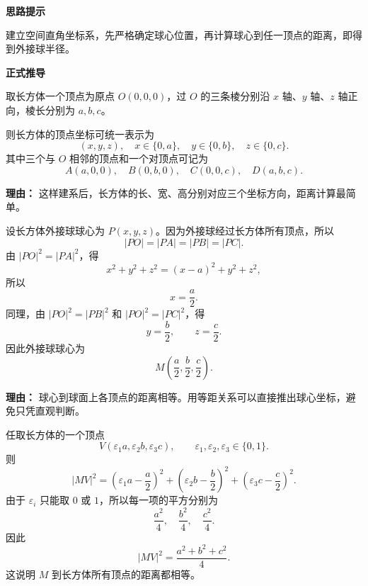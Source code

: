 \begin{proofbox}
	\textbf{\textcolor{CProof}{思路提示}}

	建立空间直角坐标系，先严格确定球心位置，再计算球心到任一顶点的距离，即得到外接球半径。

	\medskip
	\textbf{\textcolor{CProof}{正式推导}}
	\begin{description}[style=nextline, leftmargin=2.8em, labelsep=0.5em, itemsep=0.55em]
		\item[\textbf{步骤一（建立坐标系）：}]
		      取长方体一个顶点为原点 $O(0,0,0)$，过 $O$ 的三条棱分别沿 $x$ 轴、$y$ 轴、$z$ 轴正向，棱长分别为 $a,b,c$。

		      则长方体的顶点坐标可统一表示为
		      \[
			      (x,y,z),\quad x\in\{0,a\},\quad y\in\{0,b\},\quad z\in\{0,c\}.
		      \]
		      其中三个与 $O$ 相邻的顶点和一个对顶点可记为
		      \[
			      A(a,0,0),\quad B(0,b,0),\quad C(0,0,c),\quad D(a,b,c).
		      \]
		      \par\textbf{理由：}
		      这样建系后，长方体的长、宽、高分别对应三个坐标方向，距离计算最简单。

		\item[\textbf{步骤二（严格确定球心）：}]
		      设长方体外接球球心为 $P(x,y,z)$。因为外接球经过长方体所有顶点，所以
		      \[
			      |PO|=|PA|=|PB|=|PC|.
		      \]
		      由 $|PO|^2=|PA|^2$，得
		      \[
			      x^2+y^2+z^2=(x-a)^2+y^2+z^2,
		      \]
		      所以
		      \[
			      x=\frac{a}{2}.
		      \]
		      同理，由 $|PO|^2=|PB|^2$ 和 $|PO|^2=|PC|^2$，得
		      \[
			      y=\frac{b}{2},\qquad z=\frac{c}{2}.
		      \]
		      因此外接球球心为
		      \[
			      M\left(\frac{a}{2},\frac{b}{2},\frac{c}{2}\right).
		      \]
		      \par\textbf{理由：}
		      球心到球面上各顶点的距离相等。用等距关系可以直接推出球心坐标，避免只凭直观判断。

		\item[\textbf{步骤三（验证所有顶点都在同一球面上）：}]
		      任取长方体的一个顶点
		      \[
			      V(\varepsilon_1 a,\varepsilon_2 b,\varepsilon_3 c),
			      \qquad \varepsilon_1,\varepsilon_2,\varepsilon_3\in\{0,1\}.
		      \]
		      则
		      \[
			      |MV|^2
			      =
			      \left(\varepsilon_1a-\frac{a}{2}\right)^2
			      +
			      \left(\varepsilon_2b-\frac{b}{2}\right)^2
			      +
			      \left(\varepsilon_3c-\frac{c}{2}\right)^2.
		      \]
		      由于 $\varepsilon_i$ 只能取 $0$ 或 $1$，所以每一项的平方分别为
		      \[
			      \frac{a^2}{4},\quad \frac{b^2}{4},\quad \frac{c^2}{4}.
		      \]
		      因此
		      \[
			      |MV|^2=\frac{a^2+b^2+c^2}{4}.
		      \]
		      这说明 $M$ 到长方体所有顶点的距离都相等。


\end{description}
\end{proofbox}
